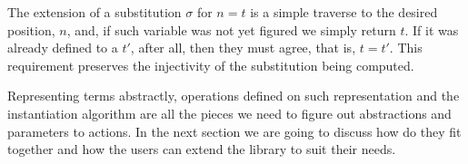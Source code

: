 
The extension of a substitution $\sigma$ for $n = t$ is a simple traverse to the desired position, $n$, and, if such variable was not yet figured we simply return $t$. If it was already defined to a $t'$, after all, then they must agree, that is, $t = t'$. This requirement preserves the injectivity of
the substitution being computed. 


Representing terms abstractly, operations defined on such representation and
the instantiation algorithm are all the pieces we need to figure out abstractions and parameters to actions. In the next section we are going to
discuss how do they fit together and how the users can extend the library
to suit their needs.
 
